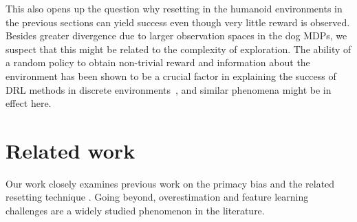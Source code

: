 This also opens up the question why resetting in the humanoid environments in the previous sections can yield success even though very little reward is observed. 
Besides greater divergence due to larger observation spaces in the dog MDPs, we suspect that this might be related to the complexity of exploration.
The ability of a random policy to obtain non-trivial reward and information about the environment has been shown to be a crucial factor in explaining the success of DRL methods in discrete environments~\parencite{laidlaw2023bridging}, and similar phenomena might be in effect here. 




\section{Related work}

Our work closely examines previous work on the primacy bias and the related resetting technique \parencite{anderson1992qlearning,nikishin2022primacy,doro2023barrier,schwarzer2023bigger}.
Going beyond, overestimation and feature learning challenges are a widely studied phenomenon in the literature.

